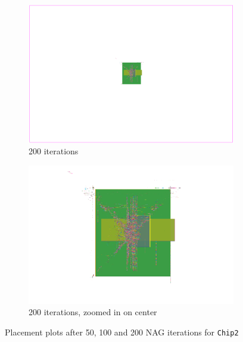 \begin{figure}[p]
 \begin{subfigure}{.48\textwidth}
  \includegraphics[width=\textwidth]{epsilon/placement_Chip2_200_iterations.png}
  \caption{200 iterations}
 \end{subfigure}
 \hfill
 \begin{subfigure}{.48\textwidth}
  \includegraphics[width=\textwidth, frame]{epsilon/placement_Chip2_200_iterations_zoomed.png}
  \caption{200 iterations, zoomed in on center}
 \end{subfigure}

 \caption{Placement plots after 50, 100 and 200 NAG iterations for \texttt{Chip2}}
 \label{fig:placement_Chip2_depending_on_max_iterations}
\end{figure}

